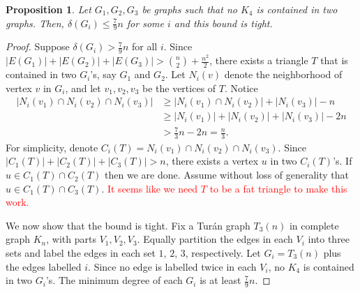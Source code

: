 \documentclass[a4paper]{article}
\newtheorem{proposition}{Proposition}
\begin{document}
\pagestyle{fancy}

\begin{proposition}
  Let $G_1, G_2, G_3$ be graphs such that no $K_4$ is contained in two graphs. Then, $\delta(G_i)
  \leq \frac{7}{9}n$ for some $i$ and this bound is tight.
\end{proposition}

\begin{proof}
  Suppose $\delta(G_i) > \frac{7}{9}n$ for all $i$. Since $|E(G_1)| + |E(G_2)| + |E(G_3)| >
  \binom{n}{2} + \frac{n^2}{2}$, there exists a triangle $T$ that is contained in two $G_i$'s, say
  $G_1$ and $G_2$. Let $N_i(v)$ denote the neighborhood of vertex $v$ in $G_i$, and let $v_1, v_2,
  v_3$ be the vertices of $T$. Notice
  \begin{align*}
    |N_i(v_1) \cap N_i(v_2) \cap N_i(v_3)| 
    &\geq |N_i(v_1) \cap N_i(v_2)| + |N_i(v_3)| - n \\
    &\geq |N_i(v_1)| + |N_i(v_2)| + |N_i(v_3)| - 2n \\
    &> \frac{7}{3}n - 2n = \frac{n}{3}.
  \end{align*}
  For simplicity, denote $C_i(T) = N_i(v_1) \cap N_i(v_2) \cap N_i(v_3)$. Since $|C_1(T)| + |C_2(T)|
  + |C_3(T)| > n$, there exists a vertex $u$ in two $C_i(T)$'s. If $u \in C_1(T) \cap C_2(T)$ then
  we are done. Assume without loss of generality that $u \in C_1(T) \cap C_3(T)$. \textcolor{red}{It
  seems like we need $T$ to be a fat triangle to make this work.} 
  
  We now show that the bound is tight. Fix a Turán graph $T_3(n)$ in complete graph $K_n$, with
  parts $V_1, V_2, V_3$. Equally partition the edges in each $V_i$ into three sets and label the
  edges in each set $1$, $2$, $3$, respectively. Let $G_i = T_3(n)$ plus the edges labelled $i$.
  Since no edge is labelled twice in each $V_i$, no $K_4$ is contained in two $G_i$'s. The minimum
  degree of each $G_i$ is at least $\frac{7}{9}n$.
\end{proof}
\end{document}
